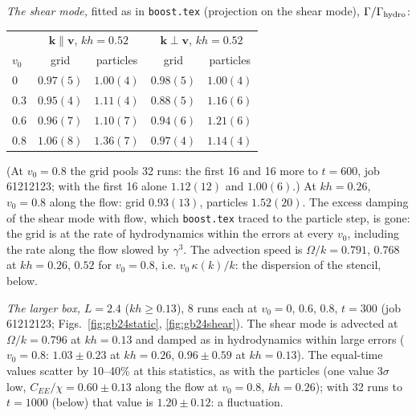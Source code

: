 \documentclass[11pt,aps,preprint,nofootinbib,superscriptaddress,tightenlines]{revtex4-2}
\begin{document}
\emph{The shear mode,} fitted as in \texttt{boost.tex} (projection on the shear mode), $\Gamma/\Gamma_{\rm hydro}$:
\begin{center}
\begin{tabular}{lcccc}
\hline
 & \multicolumn{2}{c}{$\bm k\parallel\bm v$, $kh=0.52$} & \multicolumn{2}{c}{$\bm k\perp\bm v$, $kh=0.52$} \\
$v_0$ & grid & particles & grid & particles \\ \hline
0 & $0.97(5)$ & $1.00(4)$ & $0.98(5)$ & $1.00(4)$ \\
0.3 & $0.95(4)$ & $1.11(4)$ & $0.88(5)$ & $1.16(6)$ \\
0.6 & $0.96(7)$ & $1.10(7)$ & $0.94(6)$ & $1.21(6)$ \\
0.8 & $1.06(8)$ & $1.36(7)$ & $0.97(4)$ & $1.14(4)$ \\
\hline
\end{tabular}
\end{center}
(At $v_0=0.8$ the grid pools 32 runs: the first 16 and 16 more to $t=600$, job 61212123; with the first 16
alone $1.12(12)$ and $1.00(6)$.)  At $kh=0.26$, $v_0=0.8$ along the flow: grid $0.93(13)$, particles $1.52(20)$.  The excess damping of the
shear mode with flow, which \texttt{boost.tex} traced to the particle step, is gone: the grid is at the
rate of hydrodynamics within the errors at every $v_0$, including the rate along the flow slowed by
$\gamma^3$.  The advection speed is $\Omega/k=0.791$, $0.768$ at $kh=0.26$, $0.52$ for $v_0=0.8$, i.e.
$v_0\,\kappa(k)/k$: the dispersion of the stencil, below.

\emph{The larger box,} $L=2.4$ ($kh\ge0.13$), 8 runs each at $v_0=0$, $0.6$, $0.8$, $t=300$ (job 61212123;
Figs.~\ref{fig:gb24static}, \ref{fig:gb24shear}).  The shear mode is advected at $\Omega/k=0.796$ at $kh=0.13$ and damped
as in hydrodynamics within large errors ($v_0=0.8$: $1.03\pm0.23$ at $kh=0.26$, $0.96\pm0.59$ at $kh=0.13$).  The
equal-time values scatter by 10--40\% at this statistics, as with the particles (one value $3\sigma$ low,
$C_{EE}/\chi=0.60\pm0.13$ along the flow at $v_0=0.8$, $kh=0.26$); with 32 runs to $t=1000$ (below) that value is $1.20\pm0.12$: a fluctuation.
\end{document}
